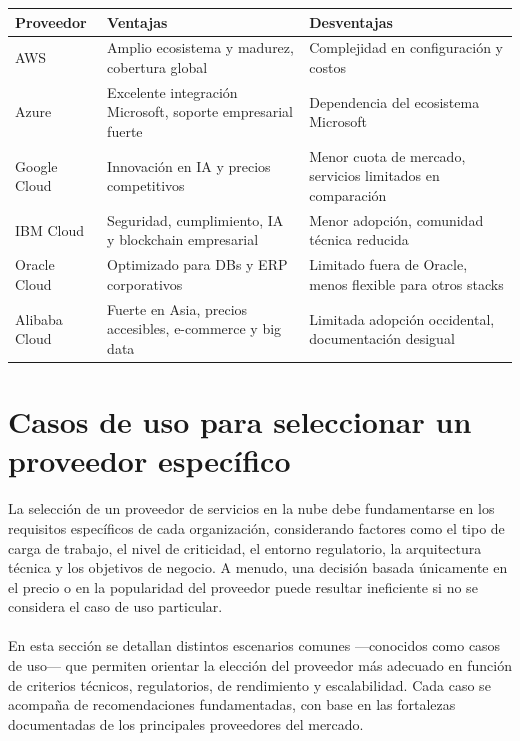 {\begin{landscape}
                \begin{tabularx}{\linewidth}{|X|X|X|}
                    \hline
                    \textbf{Proveedor} & \textbf{Ventajas} & \textbf{Desventajas} \\
                    \hline
                    AWS & Amplio ecosistema y madurez, cobertura global & Complejidad en configuración y costos \\
                    \hline
                    Azure & Excelente integración Microsoft, soporte empresarial fuerte & Dependencia del ecosistema Microsoft \\
                    \hline
                    Google Cloud & Innovación en IA y precios competitivos & Menor cuota de mercado, servicios limitados en comparación \\
                    \hline
                    IBM Cloud & Seguridad, cumplimiento, IA y blockchain empresarial & Menor adopción, comunidad técnica reducida \\
                    \hline
                    Oracle Cloud & Optimizado para DBs y ERP corporativos & Limitado fuera de Oracle, menos flexible para otros stacks \\
                    \hline
                    Alibaba Cloud & Fuerte en Asia, precios accesibles, e-commerce y big data & Limitada adopción occidental, documentación desigual \\
                    \hline
                \end{tabularx}
        \end{landscape}
    \section[Casos de uso]{Casos de uso para seleccionar un proveedor específico}
        La selección de un proveedor de servicios en la nube debe fundamentarse en los requisitos específicos de cada organización, considerando factores como el tipo de carga de trabajo, el nivel de criticidad, el entorno regulatorio, la arquitectura técnica y los objetivos de negocio. A menudo, una decisión basada únicamente en el precio o en la popularidad del proveedor puede resultar ineficiente si no se considera el caso de uso particular.
        
        \paragraph{}En esta sección se detallan distintos escenarios comunes —conocidos como casos de uso— que permiten orientar la elección del proveedor más adecuado en función de criterios técnicos, regulatorios, de rendimiento y escalabilidad. Cada caso se acompaña de recomendaciones fundamentadas, con base en las fortalezas documentadas de los principales proveedores del mercado.

}
